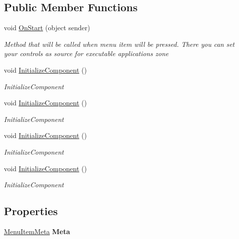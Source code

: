 \subsection*{Public Member Functions}
\begin{DoxyCompactItemize}
\item 
void \mbox{\hyperlink{class_t_h_b___plugin___exams_1_1_monitor_a57a29bc70438a8b6a186d34c37aea791}{On\+Start}} (object sender)
\begin{DoxyCompactList}\small\item\em Method that will be called when menu item will be pressed. There you can set your controls as source for executable application\textquotesingle{}s zone \end{DoxyCompactList}\item 
void \mbox{\hyperlink{class_t_h_b___plugin___exams_1_1_monitor_ae2ad56728566bc79087a4688e94db888}{Initialize\+Component}} ()
\begin{DoxyCompactList}\small\item\em Initialize\+Component \end{DoxyCompactList}\item 
void \mbox{\hyperlink{class_t_h_b___plugin___exams_1_1_monitor_ae2ad56728566bc79087a4688e94db888}{Initialize\+Component}} ()
\begin{DoxyCompactList}\small\item\em Initialize\+Component \end{DoxyCompactList}\item 
void \mbox{\hyperlink{class_t_h_b___plugin___exams_1_1_monitor_ae2ad56728566bc79087a4688e94db888}{Initialize\+Component}} ()
\begin{DoxyCompactList}\small\item\em Initialize\+Component \end{DoxyCompactList}\item 
void \mbox{\hyperlink{class_t_h_b___plugin___exams_1_1_monitor_ae2ad56728566bc79087a4688e94db888}{Initialize\+Component}} ()
\begin{DoxyCompactList}\small\item\em Initialize\+Component \end{DoxyCompactList}\end{DoxyCompactItemize}
\subsection*{Properties}
\begin{DoxyCompactItemize}
\item 
\mbox{\hyperlink{class_uniform_client_1_1_plugins_1_1_menu_item_meta}{Menu\+Item\+Meta}} {\bfseries Meta}
\end{DoxyCompactItemize}
